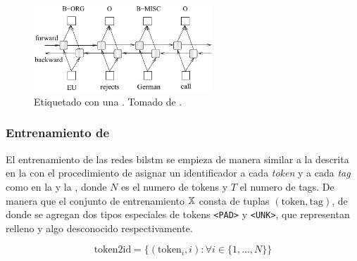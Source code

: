 \begin{figure}[H]
  \centering
  \includegraphics[width=0.6\textwidth]{Figures/bilstm-arch.pdf}
\decoRule
\caption[Etiquetado con una ]{Etiquetado con una . Tomado de \cite{Huang2015}.}
\label{fig:bilstm-arch}
\end{figure}



\subsubsection{Entrenamiento de }
El entrenamiento de las redes \gls{bilstm} se empieza de manera similar a la descrita en la  con el procedimiento de asignar un identificador a cada \emph{token} y a cada \emph{tag} como en la  y la , donde $N$ es el numero de tokens y $T$ el numero de tags. De manera que el conjunto de entrenamiento ${\mathbb{X}}$ consta de tuplas $(\text{token}, \text{tag})$, de donde se agregan dos tipos especiales de tokens \texttt{<PAD>} y \texttt{<UNK>}, que representan relleno y algo desconocido respectivamente.

\begin{equation} \label{eq:lstm-token2id}
  \text{token2id} = \Big\{(\text{token}_i, i) : \forall i \in \{1, \ldots, N\} \Big\}
\end{equation}

